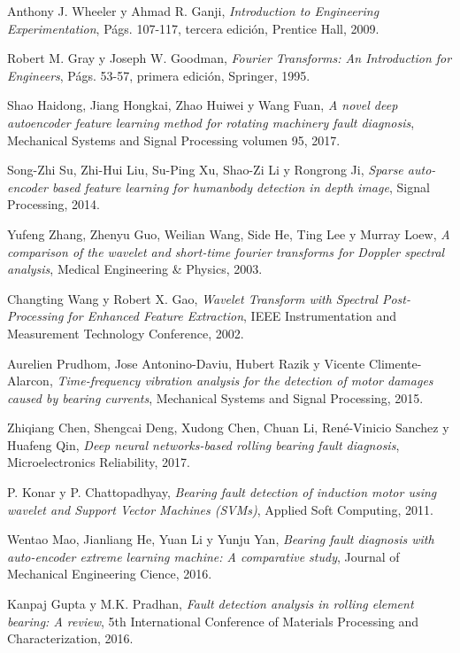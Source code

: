\documentclass[12pt]{article}%
\begin{document}
\begin{thebibliography}{9}
Anthony J. Wheeler y Ahmad R. Ganji, \textit{Introduction to Engineering Experimentation}, Págs. 107-117, tercera edición, Prentice Hall, 2009.

Robert M. Gray y Joseph W. Goodman, \textit{Fourier Transforms: An Introduction for Engineers}, Págs. 53-57, primera edición, Springer, 1995.

Shao Haidong, Jiang Hongkai, Zhao Huiwei y Wang Fuan, \textit{A novel deep autoencoder feature learning method for rotating machinery fault diagnosis}, Mechanical Systems and Signal Processing volumen 95, 2017. 

Song-Zhi Su, Zhi-Hui Liu, Su-Ping Xu, Shao-Zi Li y Rongrong Ji, \textit{Sparse auto-encoder based feature learning for humanbody detection in depth image}, Signal Processing, 2014.

Yufeng Zhang, Zhenyu Guo, Weilian Wang, Side He, Ting Lee y Murray Loew, \textit{A comparison of the wavelet and short-time fourier transforms for Doppler spectral analysis}, Medical Engineering \& Physics, 2003.

Changting Wang y Robert X. Gao, \textit{Wavelet Transform with Spectral Post-Processing for
Enhanced Feature Extraction}, IEEE Instrumentation and Measurement Technology Conference, 2002.

Aurelien Prudhom, Jose Antonino-Daviu, Hubert Razik y Vicente Climente-Alarcon, \textit{Time-frequency vibration analysis for the detection of motor damages caused by bearing currents}, Mechanical Systems and Signal Processing, 2015.

Zhiqiang Chen, Shengcai Deng, Xudong Chen, Chuan Li, René-Vinicio Sanchez y Huafeng Qin, \textit{Deep neural networks-based rolling bearing fault diagnosis}, Microelectronics Reliability, 2017.

P. Konar y P. Chattopadhyay, \textit{Bearing fault detection of induction motor using wavelet and Support Vector Machines (SVMs)}, Applied Soft Computing, 2011.

Wentao Mao, Jianliang He, Yuan Li y Yunju Yan, \textit{Bearing fault diagnosis with auto-encoder extreme learning machine: A comparative study}, Journal of Mechanical Engineering Cience, 2016.

Kanpaj Gupta y M.K. Pradhan, \textit{Fault detection analysis in rolling element bearing: A review}, 5th International Conference of Materials Processing and Characterization, 2016.


\end{thebibliography}
\end{document}
